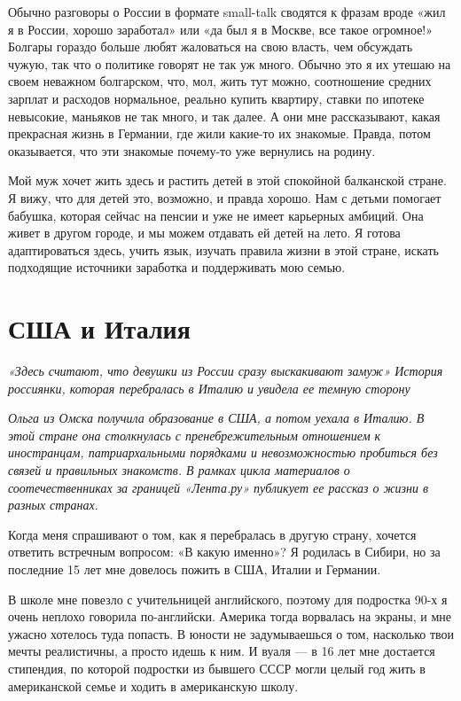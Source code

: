 Обычно разговоры о России в формате small-talk сводятся к фразам вроде «жил я в России, хорошо заработал» или «да был я в Москве, все такое огромное!» Болгары гораздо больше любят жаловаться на свою власть, чем обсуждать чужую, так что о политике говорят не так уж много. Обычно это я их утешаю на своем неважном болгарском, что, мол, жить тут можно, соотношение средних зарплат и расходов нормальное, реально купить квартиру, ставки по ипотеке невысокие, маньяков не так много, и так далее. А они мне рассказывают, какая прекрасная жизнь в Германии, где жили какие-то их знакомые. Правда, потом оказывается, что эти знакомые почему-то уже вернулись на родину.

Мой муж хочет жить здесь и растить детей в этой спокойной балканской стране. Я вижу, что для детей это, возможно, и правда хорошо. Нам с детьми помогает бабушка, которая сейчас на пенсии и уже не имеет карьерных амбиций. Она живет в другом городе, и мы можем отдавать ей детей на лето. Я готова адаптироваться здесь, учить язык, изучать правила жизни в этой стране, искать подходящие источники заработка и поддерживать мою семью.

\newpage
\section{США и Италия}
\textit{«Здесь считают, что девушки из России сразу выскакивают замуж» История россиянки, которая перебралась в Италию и увидела ее темную сторону}

\textit{Ольга из Омска получила образование в США, а потом уехала в Италию. В этой стране она столкнулась с пренебрежительным отношением к иностранцам, патриархальными порядками и невозможностью пробиться без связей и правильных знакомств. В рамках цикла материалов о соотечественниках за границей «Лента.ру» публикует ее рассказ о жизни в разных странах.}

Когда меня спрашивают о том, как я перебралась в другую страну, хочется ответить встречным вопросом: «В какую именно»? Я родилась в Сибири, но за последние 15 лет мне довелось пожить в США, Италии и Германии.

В школе мне повезло с учительницей английского, поэтому для подростка 90-х я очень неплохо говорила по-английски. Америка тогда ворвалась на экраны, и мне ужасно хотелось туда попасть. В юности не задумываешься о том, насколько твои мечты реалистичны, а просто идешь к ним. И вуаля — в 16 лет мне достается стипендия, по которой подростки из бывшего СССР могли целый год жить в американской семье и ходить в американскую школу.

